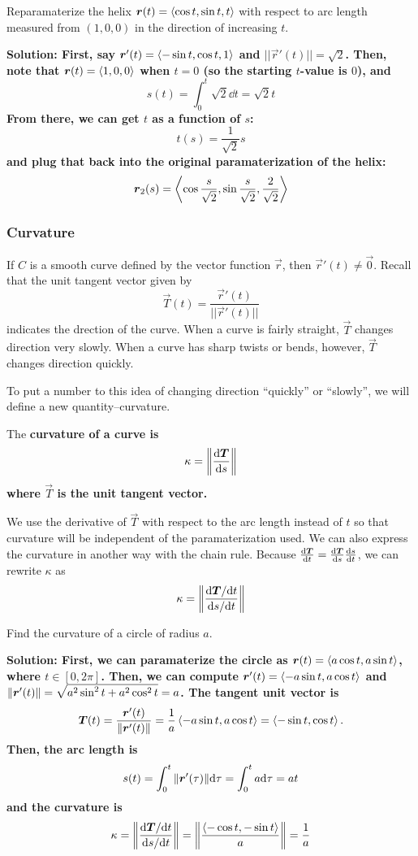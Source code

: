 \begin{example}
    Reparamaterize the helix \(\boldsymbol{r}(t) = \left\langle\cos t, \sin t, t\right\rangle\) with respect to arc length measured from \((1, 0, 0)\) in the direction of increasing \(t\).\par\bf{Solution: }First, say \(\boldsymbol{r}'(t) = \left\langle -\sin t, \cos t, 1\right\rangle\) and \(||\vec r'(t)|| = \sqrt 2\). Then, note that \(\boldsymbol{r}(t) = \left\langle1, 0, 0\right\rangle\) when \(t=0\) (so the starting \(t\)-value is \(0\)), and \[ s(t) = \int_0^t\sqrt 2\dd t = \sqrt 2t\]
    From there, we can get \(t\) as a function of \(s\):
    \[ t(s) = \frac{1}{\sqrt 2}s\]
    and plug that back into the original paramaterization of the helix:
    \[ \boldsymbol{r}_2(s) = \left\langle \cos \frac{s}{\sqrt 2}, \sin \frac{s}{\sqrt 2}, \frac{2}{\sqrt 2} \right\rangle \]
\end{example}
\subsubsection{Curvature}
If \(C\) is a smooth curve defined by the vector function \(\vec r\), then \(\vec r'(t)\neq \vec 0\). Recall that the unit tangent vector given by 
\[ \vec T(t) = \frac{\vec r'(t)}{||\vec r'(t)||} \]
indicates the drection of the curve. When a curve is fairly straight, \(\vec T\) changes direction very slowly. When a curve has sharp twists or bends, however, \(\vec T\) changes direction quickly. \par
To put a number to this idea of changing direction ``quickly'' or ``slowly'', we will define a new quantity--curvature.
\begin{definition}
    The \bf{curvature} of a curve is 
    \[ \kappa = \norm{\dv{\boldsymbol{T}}{s}} \]
    where \(\vec T\) is the unit tangent vector.
\end{definition}
We use the derivative of \(\vec T\) with respect to the arc length instead of \(t\) so that curvature will be independent of the paramaterization used. We can also express the curvature in another way with the chain rule. Because \(\dv{\boldsymbol{T}}{t}=\dv{\boldsymbol{T}}{s}\dv{s}{t}\), we can rewrite \(\kappa\) as
\[ \kappa = \norm{\frac{\dd \boldsymbol{T}/\dd t}{\dd s/\dd t}}\]
\begin{example}
    Find the curvature of a circle of radius \(a\).\par\bf{Solution: }First, we can paramaterize the circle as \(\boldsymbol{r}(t) = \left\langle a\cos t, a\sin t\right\rangle\), where \(t\in[0, 2\pi]\). Then, we can compute \(\boldsymbol{r}'(t)=\left\langle-a\sin t, a\cos t\right\rangle\) and \(\norm{\boldsymbol{r}'(t)} = \sqrt{a^2\sin^2t+a^2\cos^2t}=a\). The tangent unit vector is 
    \[ \boldsymbol{T}(t) = \frac{\boldsymbol{r}'(t)}{\norm{\boldsymbol{r}'(t)}}=\frac{1}a\left\langle-a\sin t, a\cos t\right\rangle = \left\langle-\sin t, \cos t\right\rangle. \]
    Then, the arc length is 
    \[ s(t) = \int_0^t\norm{\boldsymbol{r}'(\tau)}\dd \tau = \int_0^t a\dd \tau = at\] 
    and the curvature is 
    \[ \kappa = \norm{\frac{\dd \boldsymbol{T}/\dd t}{\dd s/\dd t}} = \norm{\frac{\left\langle-\cos t, -\sin t\right\rangle}{a}} = \frac{1}a\]
\end{example}
